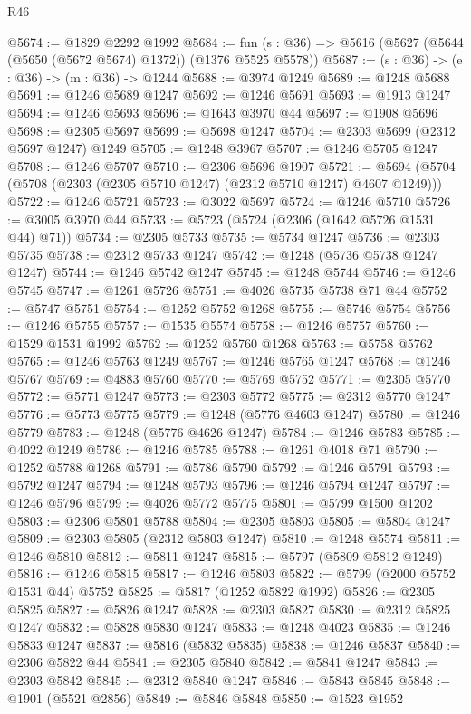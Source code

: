 \begin{lexlean}{R46}
\begin{coremodule}
@5674 := @1829 @2292 @1992
@5684 := fun (s : @36) => @5616 (@5627 (@5644 (@5650 (@5672 @5674) @1372)) (@1376 @5525 @5578))
@5687 := (s : @36) -> (e : @36) -> (m : @36) -> @1244
@5688 := @3974 @1249
@5689 := @1248 @5688
@5691 := @1246 @5689 @1247
@5692 := @1246 @5691
@5693 := @1913 @1247
@5694 := @1246 @5693
@5696 := @1643 @3970 @44
@5697 := @1908 @5696
@5698 := @2305 @5697
@5699 := @5698 @1247
@5704 := @2303 @5699 (@2312 @5697 @1247) @1249
@5705 := @1248 @3967
@5707 := @1246 @5705 @1247
@5708 := @1246 @5707
@5710 := @2306 @5696 @1907
@5721 := @5694 (@5704 (@5708 (@2303 (@2305 @5710 @1247) (@2312 @5710 @1247) @4607 @1249)))
@5722 := @1246 @5721
@5723 := @3022 @5697
@5724 := @1246 @5710
@5726 := @3005 @3970 @44
@5733 := @5723 (@5724 (@2306 (@1642 @5726 @1531 @44) @71))
@5734 := @2305 @5733
@5735 := @5734 @1247
@5736 := @2303 @5735
@5738 := @2312 @5733 @1247
@5742 := @1248 (@5736 @5738 @1247 @1247)
@5744 := @1246 @5742 @1247
@5745 := @1248 @5744
@5746 := @1246 @5745
@5747 := @1261 @5726
@5751 := @4026 @5735 @5738 @71 @44
@5752 := @5747 @5751
@5754 := @1252 @5752 @1268
@5755 := @5746 @5754
@5756 := @1246 @5755
@5757 := @1535 @5574
@5758 := @1246 @5757
@5760 := @1529 @1531 @1992
@5762 := @1252 @5760 @1268
@5763 := @5758 @5762
@5765 := @1246 @5763 @1249
@5767 := @1246 @5765 @1247
@5768 := @1246 @5767
@5769 := @4883 @5760
@5770 := @5769 @5752
@5771 := @2305 @5770
@5772 := @5771 @1247
@5773 := @2303 @5772
@5775 := @2312 @5770 @1247
@5776 := @5773 @5775
@5779 := @1248 (@5776 @4603 @1247)
@5780 := @1246 @5779
@5783 := @1248 (@5776 @4626 @1247)
@5784 := @1246 @5783
@5785 := @4022 @1249
@5786 := @1246 @5785
@5788 := @1261 @4018 @71
@5790 := @1252 @5788 @1268
@5791 := @5786 @5790
@5792 := @1246 @5791
@5793 := @5792 @1247
@5794 := @1248 @5793
@5796 := @1246 @5794 @1247
@5797 := @1246 @5796
@5799 := @4026 @5772 @5775
@5801 := @5799 @1500 @1202
@5803 := @2306 @5801 @5788
@5804 := @2305 @5803
@5805 := @5804 @1247
@5809 := @2303 @5805 (@2312 @5803 @1247)
@5810 := @1248 @5574
@5811 := @1246 @5810
@5812 := @5811 @1247
@5815 := @5797 (@5809 @5812 @1249)
@5816 := @1246 @5815
@5817 := @1246 @5803
@5822 := @5799 (@2000 @5752 @1531 @44) @5752
@5825 := @5817 (@1252 @5822 @1992)
@5826 := @2305 @5825
@5827 := @5826 @1247
@5828 := @2303 @5827
@5830 := @2312 @5825 @1247
@5832 := @5828 @5830 @1247
@5833 := @1248 @4023
@5835 := @1246 @5833 @1247
@5837 := @5816 (@5832 @5835)
@5838 := @1246 @5837
@5840 := @2306 @5822 @44
@5841 := @2305 @5840
@5842 := @5841 @1247
@5843 := @2303 @5842
@5845 := @2312 @5840 @1247
@5846 := @5843 @5845
@5848 := @1901 (@5521 @2856)
@5849 := @5846 @5848
@5850 := @1523 @1952

\end{coremodule}
\end{lexlean}
